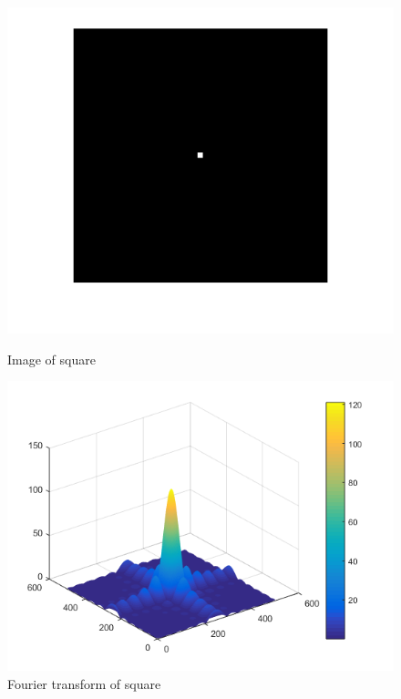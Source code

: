 \begin{figure}[H]
	\centering
	\begin{minipage}[t]{0.4\textwidth}
		\includegraphics[width=\textwidth]{images/square.png}
		\caption{Image of square}
		\label{fig:bar}
	\end{minipage}
	\begin{minipage}[t]{0.4\textwidth}
		\includegraphics[width=\textwidth]{images/fouriertrafosquare.png}
		\caption{Fourier transform of square }
		\label{fig:fouriertrafosquare}
	\end{minipage}
\end{figure}

